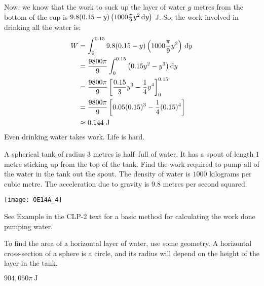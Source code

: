\begin{solution}
Now, we know that the work to suck up the layer of water $y$ metres from the bottom of the cup is $9.8(0.15-y)\left(1000\frac{\pi}{9}y^2\,\mathrm{d}y\right)$ J. So, the work involved in drinking all the water is:
\begin{align*}
W&=\int_0^{0.15}9.8(0.15-y)\left(1000\frac{\pi}{9}y^2\right)\,\mathrm{d}y \\
&= \frac{9800\pi}{9}\int_0^{0.15}\big(0.15y^2-y^3\big)\,\mathrm{d}y\\
&= \frac{9800\pi}{9}\left[\frac{0.15}{3}y^3-\frac{1}{4}y^4 \right]_0^{0.15}
\\&= \frac{9800\pi}{9}\left[{0.05} (0.15)^3-\frac{1}{4}(0.15)^4 \right]\\
&\approx 0.144\text{ J}
\end{align*}
Even drinking water takes work. Life is hard.
\end{solution}

\begin{Mquestion}[2014A]\label{prob_s2.1:tank1}
A spherical tank of radius $3$ metres is half--full of water.
It has a spout of length $1$ metre sticking up from the top of
the tank. Find the work required to pump all of the water
in the tank out the spout. The density of water is $1000$ kilograms
per cubic metre. The acceleration due to gravity is $9.8$ metres
per second squared.

\begin{center}
       \texttt{[image: OE14A\_4]}
\end{center}

\end{Mquestion}

\begin{hint}
See Example  in the
CLP-2 text for a basic method for calculating the work done pumping water.

 To find the area of a horizontal layer of water, use some geometry. A horizontal cross-section of a sphere is a circle, and its radius will depend on the height of the layer in the tank.
\end{hint}

\begin{answer}
$904{,}050\pi\ \text{J}$
\end{answer}

